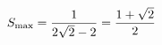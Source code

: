 \documentclass[preview]{standalone}
\begin{document}
\begin{align*}
\special{dvisvgm:raw <g id='unique000'>}S_{\max}=\frac{1}{2\sqrt2-2}=\frac{1+\sqrt2}{2}\special{dvisvgm:raw </g>}
\end{align*}
\end{document}
